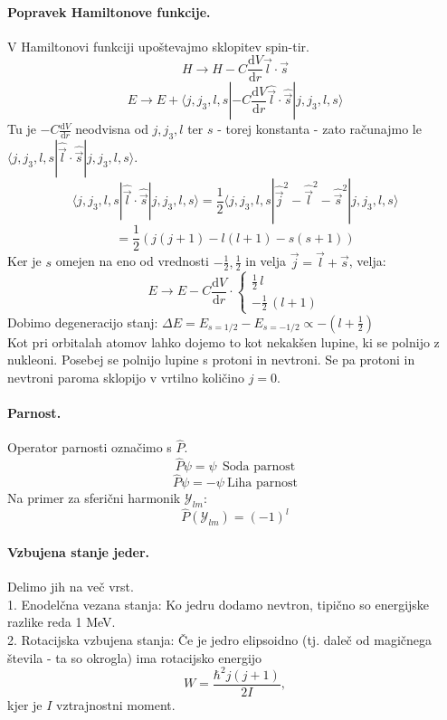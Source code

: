 \documentclass[a4paper]{article}
\newcommand{\vct}[1]{\overrightarrow{#1}}
\newcommand{\dd}[2]{\frac{\mathrm{d} {#1}}{\mathrm{d} {#2}}}
\newcommand{\avg}[1]{\langle {#1} \rangle}
\begin{document}
\paragraph{Popravek Hamiltonove funkcije.} V Hamiltonovi funkciji upoštevajmo sklopitev spin-tir.
$$H \to H - C\dd{V}{r} \vct{l} \cdot \vct{s}$$
$$E \to E + \avg{j, j_3, l, s|-C\dd{V}{r}\hat{\vct{l}}\cdot\hat{\vct{s}}|j, j_3, l, s}$$
Tu je $\displaystyle{-C\dd{V}{r}}$ neodvisna od $j, j_3, l$ ter $s$ - torej konstanta - zato računajmo le $\avg{j, j_3, l, s|\hat{\vct{l}}\cdot\hat{\vct{s}}|j, j_3, l, s}$.
$$\avg{j, j_3, l, s|\hat{\vct{l}}\cdot\hat{\vct{s}}|j, j_3, l, s} = \frac{1}{2}\avg{j, j_3, l, s|\hat{\vct{j}}^2 - \hat{\vct{l}}^2 - \hat{\vct{s}}^2|j, j_3, l, s}$$
$$= \frac{1}{2}\left(j(j+1) - l(l+1) - s(s+1)\right)$$
Ker je $s$ omejen na eno od vrednosti $\displaystyle{-\frac{1}{2}, \frac{1}{2}}$ in velja $\vct{j} = \vct{l} + \vct{s}$, velja:
$$E \to E - C\dd{V}{r}\cdot\begin{cases}
    \frac{1}{2}\,l \\
    - \frac{1}{2}\,(l+1)
\end{cases}$$
Dobimo degeneracijo stanj:
$\displaystyle{\Delta E = E_{s = 1/2} - E_{s = - 1/2} \propto - (l + \frac{1}{2})}$
\\
Kot pri orbitalah atomov lahko dojemo to kot nekakšen lupine, ki se polnijo z nukleoni. Posebej se polnijo lupine s protoni in nevtroni.
Se pa protoni in nevtroni paroma sklopijo v vrtilno količino $j = 0$.
\paragraph{Parnost.} Operator parnosti označimo s $\hat{P}$.
$$\hat{P} \psi = \psi ~~\text{Soda parnost}$$
$$\hat{P} \psi = -\psi ~\text{Liha parnost}$$
Na primer za sferični harmonik $\mathcal{Y}_{lm}$:
$$\hat{P}(\mathcal{Y}_{lm}) = (-1)^l$$
\paragraph{Vzbujena stanje jeder.} Delimo jih na več vrst. \\[3mm]
1. Enodelčna vezana stanja: Ko jedru dodamo nevtron, tipično so energijske razlike reda 1 MeV. \\[3mm]
2. Rotacijska vzbujena stanja: Če je jedro elipsoidno (tj. daleč od magičnega števila - ta so okrogla)
ima rotacijsko energijo $$W = \frac{\hbar^2j(j+1)}{2I},$$ kjer je $I$ vztrajnostni moment. 
\end{document}
